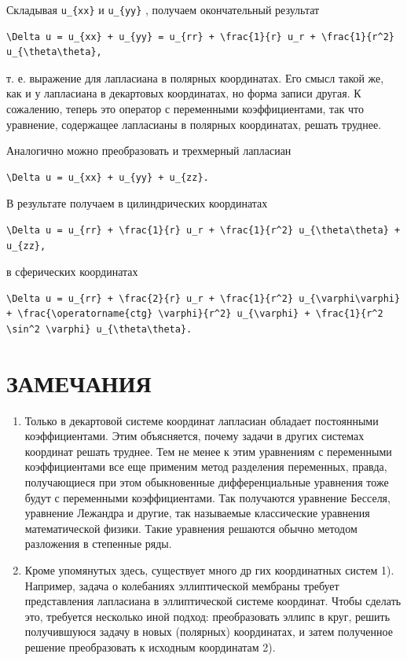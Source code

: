 \documentclass[
  ukrainian,
]{article}
\begin{document}
Складывая \texttt{u\_\{xx\}} и \texttt{u\_\{yy\}} , получаем
окончательный результат

\begin{verbatim}
\Delta u = u_{xx} + u_{yy} = u_{rr} + \frac{1}{r} u_r + \frac{1}{r^2} u_{\theta\theta},
\end{verbatim}

т. е. выражение для лапласиана в полярных координатах. Его смысл такой
же, как и у лапласиана в декартовых координатах, но форма записи другая.
К сожалению, теперь это оператор с переменными коэффициентами, так что
уравнение, содержащее лапласианы в полярных координатах, решать труднее.

Аналогично можно преобразовать и трехмерный лапласиан

\begin{verbatim}
\Delta u = u_{xx} + u_{yy} + u_{zz}.
\end{verbatim}

В результате получаем в цилиндрических координатах

\begin{verbatim}
\Delta u = u_{rr} + \frac{1}{r} u_r + \frac{1}{r^2} u_{\theta\theta} + u_{zz},
\end{verbatim}

в сферических координатах

\begin{verbatim}
\Delta u = u_{rr} + \frac{2}{r} u_r + \frac{1}{r^2} u_{\varphi\varphi} + \frac{\operatorname{ctg} \varphi}{r^2} u_{\varphi} + \frac{1}{r^2 \sin^2 \varphi} u_{\theta\theta}.
\end{verbatim}

\section{ЗАМЕЧАНИЯ}\label{ux437ux430ux43cux435ux447ux430ux43dux438ux44f-8}

\begin{enumerate}
\def\labelenumi{\arabic{enumi}.}
\item
  Только в декартовой системе координат лапласиан обладает постоянными
  коэффициентами. Этим объясняется, почему задачи в других системах
  координат решать труднее. Тем не менее к этим уравнениям с переменными
  коэффициентами все еще применим метод разделения переменных, правда,
  получающиеся при этом обыкновенные дифференциальные уравнения тоже
  будут с переменными коэффициентами. Так получаются уравнение Бесселя,
  уравнение Лежандра и другие, так называемые классические уравнения
  математической физики. Такие уравнения решаются обычно методом
  разложения в степенные ряды.
\item
  Кроме упомянутых здесь, существует много др гих координатных систем
  1). Например, задача о колебаниях эллиптической мембраны требует
  представления лапласиана в эллиптической системе координат. Чтобы
  сделать это, требуется несколько иной подход: преобразовать эллипс в
  круг, решить получившуюся задачу в новых (полярных) координатах, и
  затем полученное решение преобразовать к исходным координатам 2).
\end{enumerate}
\end{document}
